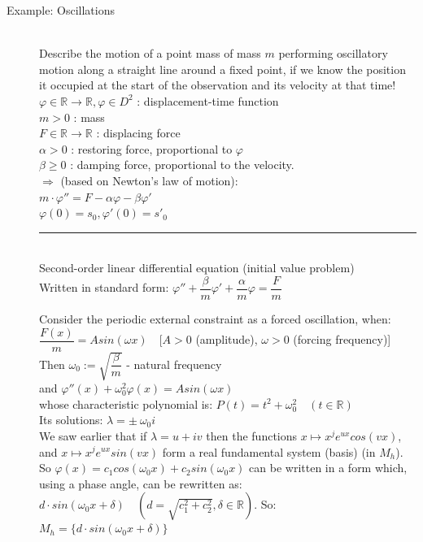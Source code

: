 \documentclass[margin=0px]{article}
\newcommand{\R}{\mathbb{R}}
\begin{document}
\begin{description}
    \item[Example: Oscillations] \hfill \\
        Describe the motion of a point mass of mass $m$ performing oscillatory motion along a straight line around a fixed point, if we know the position it occupied at the start of the observation and its velocity at that time! \\
        $ \varphi \in \R \rightarrow \R, \varphi \in D^2$ : displacement-time function \\
        $ m > 0 $ : mass \\
        $ F \in \R \rightarrow \R $ : displacing force \\
        $ \alpha > 0 $ : restoring force, proportional to $ \varphi $ \\
        $ \beta \geq 0 $ : damping force, proportional to the velocity. \\
        $ \Longrightarrow $ (based on Newton's law of motion):\\
        $ m \cdot \varphi'' = F - \alpha\varphi-\beta\varphi'$\\
        $ \varphi(0) = s_0, \varphi'(0) = s'_0 $\\
        \rule{4cm}{0.2pt} \\
        Second-order linear differential equation (initial value problem)\\
        Written in standard form: $ \varphi'' + \dfrac{\beta}{m}\varphi' + \dfrac{\alpha}{m}\varphi = \dfrac{F}{m} $

        Consider the periodic external constraint as a forced oscillation, when: \\
        $ \dfrac{F(x)}{m} = Asin(\omega x )  \quad [A>0$ (amplitude), $ \omega > 0$ (forcing frequency)] \\
            Then $ \omega_0 := \sqrt{\dfrac{\beta}{m}} $ - natural frequency\\
            and $\varphi''(x) + \omega_0^2\varphi(x) = Asin(\omega x) $ \\
            whose characteristic polynomial is: $ P(t) = t^2+\omega_0^2 \quad (t \in \R) $ \\
            Its solutions: $ \lambda = \pm \ \omega_0i $ \\

            We saw earlier that if $ \lambda = u+iv$ then the functions $ x \mapsto x^je^{ux}cos(vx)$, and $x \mapsto x^je^{ux}sin(vx)$ form a real fundamental system (basis) (in $M_h$). So $ \varphi(x) = c_1cos(\omega_0x) + c_2sin(\omega_0x) $ can be written in a form which, using a phase angle, can be rewritten as: $ d\cdot sin(\omega_0x+\delta) \quad (d = \sqrt{c_1^2+c_2^2}, \delta \in \R)$. So: \\
        $ M_h =  \{ d\cdot sin(\omega_0x+\delta)\}$


\end{description}
\end{document}
